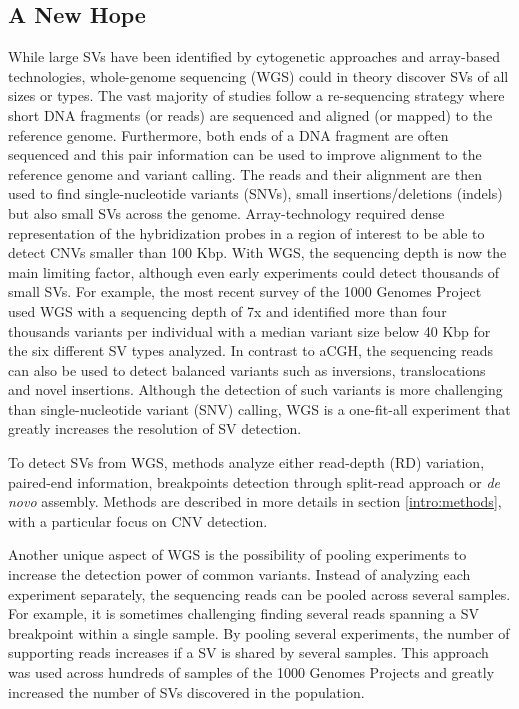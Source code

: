 \subsection{A New Hope}
While large SVs have been identified by cytogenetic approaches and array-based technologies, whole-genome sequencing (WGS) could in theory discover SVs of all sizes or types\cite{Alkan2011}.
The vast majority of studies follow a re-sequencing strategy where short DNA fragments (or reads) are sequenced and aligned (or mapped) to the reference genome.
Furthermore, both ends of a DNA fragment are often sequenced and this pair information can be used to improve alignment to the reference genome and variant calling.
The reads and their alignment are then used to find single-nucleotide variants (SNVs), small insertions/deletions (indels) but also small SVs across the genome.
Array-technology required dense representation of the hybridization probes in a region of interest to be able to detect CNVs smaller than 100 Kbp.
With WGS, the sequencing depth is now the main limiting factor, although even early experiments could detect thousands of small SVs.
For example, the most recent survey of the 1000 Genomes Project used WGS with a sequencing depth of 7x and identified more than four thousands variants per individual with a median variant size below 40 Kbp for the six different SV types analyzed\cite{Sudmant2015a}.
In contrast to aCGH, the sequencing reads can also be used to detect balanced variants such as inversions, translocations and novel insertions.
Although the detection of such variants is more challenging than single-nucleotide variant (SNV) calling, WGS is a one-fit-all experiment that greatly increases the resolution of SV detection.

To detect SVs from WGS, methods analyze either read-depth (RD) variation\cite{Boeva2011,Abyzov2011,Klambauer2012}, paired-end information\cite{Chen2009,Lindberg2014}, breakpoints detection through split-read approach\cite{Ye2009} or {\it de novo} assembly\cite{Rimmer2014}.
Methods are described in more details in section \ref{intro:methods}, with a particular focus on CNV detection.

Another unique aspect of WGS is the possibility of pooling experiments to increase the detection power of common variants.
Instead of analyzing each experiment separately, the sequencing reads can be pooled across several samples.
For example, it is sometimes challenging finding several reads spanning a SV breakpoint within a single sample.
By pooling several experiments, the number of supporting reads increases if a SV is shared by several samples.
This approach was used across hundreds of samples of the 1000 Genomes Projects and greatly increased the number of SVs discovered in the population\cite{Mills2011,Handsaker2011}.


